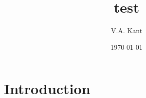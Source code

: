 \documentclass{article}
\title{test}
\author{V.A. Kant}
\date{\today}
\begin{document}
\maketitle

\section{Introduction}
\end{document}
